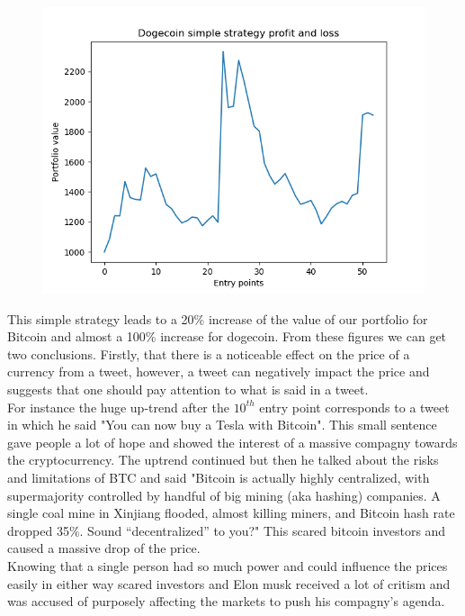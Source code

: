 \documentclass[twoside]{report}
\begin{document}
\begin{spacing}{1}
\begin{figure}[!htbp]
    \centering
    \includegraphics[scale = 0.5]{TestPlots/plot-DOGE-pnl.png}
    \caption{}
    \label{}
\end{figure}

This simple strategy leads to a 20\% increase of the value of our portfolio for Bitcoin and almost a 100\% increase for dogecoin. 
From these figures we can get two conclusions. Firstly, that there is a noticeable effect on the price of a currency from a tweet, however, a tweet can negatively impact the price and suggests that one should pay attention to what is said in a tweet.\\
For instance the huge up-trend after the $10^{th}$ entry point corresponds to a tweet in which he said "You can now buy a Tesla with Bitcoin". This small sentence gave people a lot of hope and showed the interest of a massive compagny towards the cryptocurrency. The uptrend continued but then he talked about the risks and limitations of BTC and said "Bitcoin is actually highly centralized, with supermajority controlled by handful of big mining (aka hashing) companies. A single coal mine in Xinjiang flooded, almost killing miners, and Bitcoin hash rate dropped 35\%. Sound “decentralized” to you?" This scared bitcoin investors and caused a massive drop of the price.\\
Knowing that a single person had so much power and could influence the prices easily in either way scared investors and Elon musk received a lot of critism and was accused of purposely affecting the markets to push his compagny's agenda. 








\end{spacing}
\end{document}
